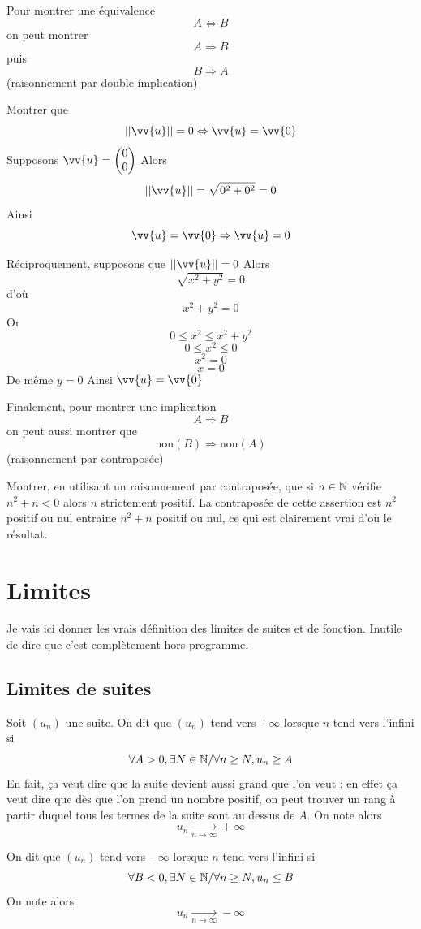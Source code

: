 Pour montrer une équivalence 
$$A \Leftrightarrow B$$ on peut montrer $$A \Rightarrow B$$ puis $$B \Rightarrow A$$ (raisonnement par double implication)\newline

\begin{exemple}
Montrer que $$||\vv{u}|| = 0 \Leftrightarrow \vv{u} = \vv{0}$$
Supposons $\vv{u} = \covec{0}{0}$ Alors $$||\vv{u}|| = \sqrt{0^2+0^2} = 0$$ Ainsi $$\vv{u} = \vv{0} \Rightarrow \vv{u} = 0$$

Réciproquement, supposons que $||\vv{u}|| = 0$ Alors $$\sqrt{x^2+y^2} = 0$$ d'où $$x^2+y^2 = 0$$ Or 
$$0 \leq x^2 \leq x^2 + y^2$$
$$0 \leq x^2 \leq 0$$
$$x^2=0$$
$$x=0$$
De même $y=0$
Ainsi $\vv{u} = \vv{0}$
\end{exemple}
Finalement, pour montrer une implication 
$$A \Rightarrow B$$
on peut aussi montrer que $$\text{non}(B) \Rightarrow \text{non}(A)$$
(raisonnement par contraposée)\newline

\begin{exemple}
Montrer, en utilisant un raisonnement par contraposée, que si $n\in \mathbb{N}$ vérifie $n^2 + n < 0$ alors $n$ strictement positif. 
La contraposée de cette assertion est $n^2$ positif ou nul entraine $n^2+n$ positif ou nul, ce qui est clairement vrai d'où le résultat. 
\end{exemple}
\chapter{Limites}Je vais ici donner les vrais définition des limites de suites et de fonction. Inutile de dire que c'est complètement hors programme.
\section{Limites de suites}
Soit $(u_n)$ une suite. On dit que $(u_n)$ tend vers $+\infty$ lorsque $n$ tend vers l'infini si 
$$\forall A > 0, \exists N \in \mathbb{N} / \forall n \geq N, u_n \geq A$$
En fait, ça veut dire que la suite devient aussi grand que l'on veut : en effet ça veut dire que dès que l'on prend un nombre positif, on peut trouver un rang à partir duquel tous les termes de la suite sont au dessus de $A$. On note alors $$u_n \underset{n\rightarrow \infty}{\longrightarrow} +\infty$$ 


On dit que $(u_n)$ tend vers $-\infty$ lorsque $n$ tend vers l'infini si 
$$\forall B < 0, \exists N \in \mathbb{N} / \forall n \geq N, u_n \leq B$$
On note alors $$u_n \underset{n\rightarrow \infty}{\longrightarrow} -\infty$$ 

